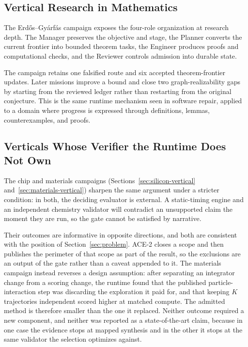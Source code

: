 \subsection{Vertical Research in Mathematics}

The Erd\H{o}s--Gy\'arf\'as campaign exposes the four-role organization at research
depth. The Manager preserves the objective and stage, the Planner converts the
current frontier into bounded theorem tasks, the Engineer produces proofs and
computational checks, and the Reviewer controls admission into durable state.

The campaign retains one falsified route and six accepted theorem-frontier updates.
Later missions improve a bound and close two graph-realizability gaps by starting
from the reviewed ledger rather than restarting from the original conjecture. This
is the same runtime mechanism seen in software repair, applied to a domain where
progress is expressed through definitions, lemmas, counterexamples, and proofs.

\subsection{Verticals Whose Verifier the Runtime Does Not Own}

The chip and materials campaigns (Sections~\ref{sec:silicon-vertical}
and~\ref{sec:materials-vertical}) sharpen the same argument under a stricter
condition: in both, the deciding evaluator is external. A static-timing engine and
an independent chemistry validator will contradict an unsupported claim the moment
they are run, so the gate cannot be satisfied by narrative.

Their outcomes are informative in opposite directions, and both are consistent with
the position of Section~\ref{sec:problem}. ACE-2 closes a scope and then publishes
the perimeter of that scope as part of the result, so the exclusions are an output of
the gate rather than a caveat appended to it. The materials campaign instead reverses
a design assumption: after separating an integrator change from a scoring change, the
runtime found that the published particle-interaction step was discarding the
exploration it paid for, and that keeping $K$ trajectories independent scored higher
at matched compute. The admitted method is therefore smaller than the one it replaced.
Neither outcome required a new component, and neither was reported as a
state-of-the-art claim, because in one case the evidence stops at mapped synthesis and
in the other it stops at the same validator the selection optimizes against.

